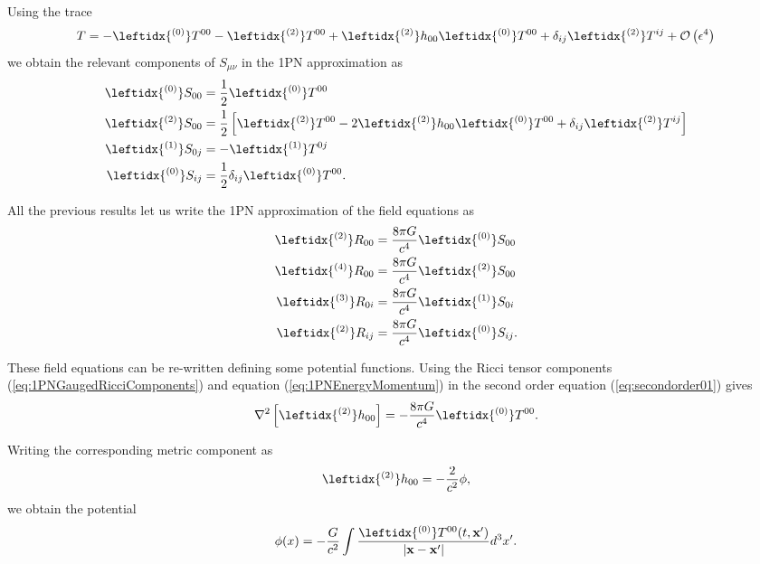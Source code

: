 Using the trace 
\begin{equation}
 T = -\leftidx{^{(0)}} T^{00} -\leftidx{^{(2)}} T^{00} + \leftidx{^{(2)}} h_{00} \leftidx{^{(0)}} T^{00} + \delta_{ij} \leftidx{^{(2)}} T^{ij} + \mathcal{O} \left( \epsilon^4 \right)
 \end{equation} 
we obtain the relevant components of $S_{\mu \nu}$ in the 1PN approximation as
\begin{subequations} \label{eq:1PNEnergyMomentum}
\begin{align}
\leftidx{ ^{(0)}} S_{00}  &= \frac{1}{2} \leftidx{ ^{(0)}} T^{00} \\
\leftidx{ ^{(2)}} S_{00}  &= \frac{1}{2} \left[ \leftidx{ ^{(2)}} T^{00} - 2 \leftidx{ ^{(2)}} h_{00} \leftidx{ ^{(0)}} T^{00} + \delta_{ij} \leftidx{ ^{(2)}} T^{ij} \right] \\
\leftidx{ ^{(1)}} S_{0j} &=- \leftidx{ ^{(1)}} T^{0j} \\
\leftidx{ ^{(0)}} S_{ij} &= \frac{1}{2} \delta_{ij} \leftidx{ ^{(0)}} T^{00}.
\end{align}
\end{subequations}

All the previous results let us write the 1PN approximation of the field equations as
\begin{subequations}
\begin{align}
\leftidx{^{(2)}}R_{00} &= \frac{8\pi G}{c^4} \leftidx{^{(0)}}S_{00}  \label{eq:secondorder01} \\
\leftidx{^{(4)}}R_{00} &= \frac{8\pi G}{c^4} \leftidx{^{(2)}}S_{00}  \label{eq:fourthorder} \\
\leftidx{^{(3)}}R_{0i} &= \frac{8\pi G}{c^4} \leftidx{^{(1)}}S_{0i}  \label{eq:thirdorder} \\
\leftidx{^{(2)}}R_{ij} &= \frac{8\pi G}{c^4} \leftidx{^{(0)}}S_{ij}. \label{eq:secondorder02}
\end{align}
\end{subequations}

These field equations can be re-written defining some potential functions. Using the Ricci tensor components (\ref{eq:1PNGaugedRicciComponents}) and equation (\ref{eq:1PNEnergyMomentum}) in the second order equation (\ref{eq:secondorder01}) gives
\begin{equation}
\nabla^2 \left[ \leftidx{^{(2)}} h_{00} \right] = - \frac{8\pi G}{c^4} \leftidx{^{(0)}}T^{00} .
\end{equation}

Writing the corresponding metric component as
\begin{equation}
\leftidx{^{(2)}} h_{00} = -\frac{2}{c^2} \phi ,
\end{equation}
we obtain the potential
\begin{equation}
\phi (x) = - \frac{G}{c^2} \int \frac{\leftidx{^{(0)}}T^{00} (t,  \textbf{x}')}{\left|  \textbf{x} - \textbf{x}' \right|} d^3 x'. \label{eq:NewtonianPotential}
\end{equation}

